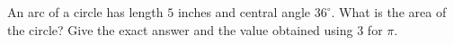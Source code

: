 An arc of a circle has length $5$ inches and central angle $36^\circ$. What is the area of the circle? Give the exact answer and the value obtained using $3$ for $\pi$.
